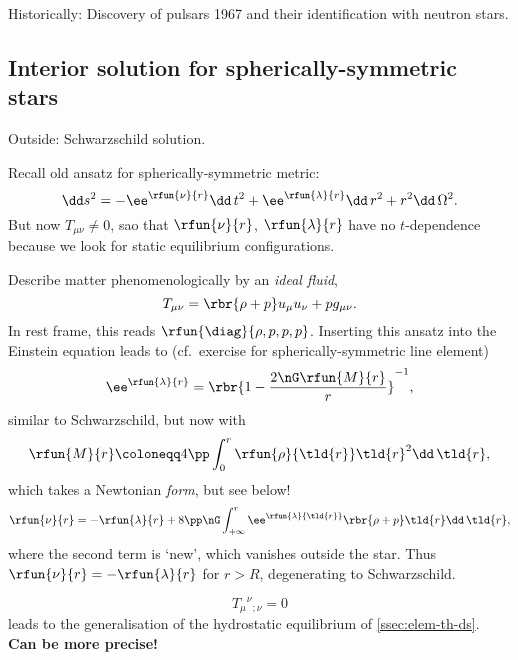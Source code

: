 Historically: Discovery of pulsars 1967 and their identification with neutron
stars.


\subsection{Interior solution for spherically-symmetric stars}
\label{sec:11-2}
Outside: Schwarzschild solution.

Recall old ansatz for spherically-symmetric metric:
\begin{equation}
\dd s^2 = -\ee^{\rfun{\nu}{r}}\dd\, t^2 + \ee^{\rfun{\lambda}{r}}\dd\, r^2
+ r^2\dd\,\Omega^2.
\label{eq:sph-sym-metric}
\end{equation}
But now $T_{\mu\nu} \neq 0$, sao that $\rfun{\nu}{r}$, $\rfun{\lambda}{r}$
have no $t$-dependence because we look for static equilibrium configurations.

Describe matter phenomenologically by an \emph{ideal fluid},
\begin{equation}
T_{\mu\nu} = \rbr{\rho+p}u_\mu u_\nu + pg_{\mu\nu}.
\label{eq:emt-ideal-fluid}
\end{equation}
In rest frame, this reads $\rfun{\diag}{\rho, p, p, p}$. Inserting this ansatz
into the Einstein equation leads to (cf.\ exercise for spherically-symmetric
line element)
\begin{equation}
\ee^{\rfun{\lambda}{r}} = \rbr{1-\frac{2\nG\rfun{M}{r}}{r}}^{-1},
\label{eq:e-to-lambda-of-r}
\end{equation}
similar to Schwarzschild, but now with
\begin{equation}
\rfun{M}{r}\coloneqq 4\pp\int_0^r\rfun{\rho}{\tld{r}}\tld{r}^2\dd\,\tld{r},
\label{eq:mass-of-radius}
\end{equation}
which takes a Newtonian \emph{form}, but see below!
\begin{equation}
\rfun{\nu}{r} = -\rfun{\lambda}{r} + 8\pp\nG\int_{+\infty}^r
\ee^{\rfun{\lambda}{\tld{r}}}\rbr{\rho+p}\tld{r}\dd\,\tld{r},
\label{eq:nu-of-radius}
\end{equation}
where the second term is `new', which vanishes outside the star. Thus
$\rfun{\nu}{r} = -\rfun{\lambda}{r}$ for $r > R$, degenerating to
Schwarzschild.


\begin{equation}
T_\mu{}^\nu{}_{;\nu} = 0
\label{eq:cons-ene-mom-ten}
\end{equation}
leads to the generalisation of the hydrostatic
equilibrium of \cref{ssec:elem-th-ds}. \textbf{Can be more precise!}

